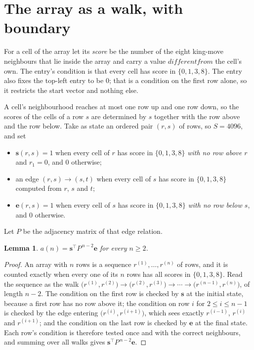\documentclass[11pt,a4paper]{article}
\theoremstyle{plain}
\newtheorem{lemma}[theorem]{Lemma}
\theoremstyle{definition}
\begin{document}
\section{The array as a walk, with boundary}

For a cell of the array let its \emph{score} be the number of the eight king-move neighbours that lie inside
the array and carry a value $different from$ the cell's own. The entry's condition is that every cell
has score in $\{0,1,3,8\}$. The entry also fixes the top-left entry to be $0$; that is a condition on the first row alone, so it restricts the start vector and nothing else.

A cell's neighbourhood reaches at most one row up and one row down, so the scores of the
cells of a row $s$ are determined by $s$ together with the row above and the row below.
Take as state an ordered pair $(r,s)$ of rows, so $S=4096$, and set
\begin{itemize}
\item $\mathbf{s}(r,s)=1$ when every cell of $r$ has score in $\{0,1,3,8\}$ \emph{with no row
above $r$} and $r_1=0$, and $0$ otherwise;
\item an edge $(r,s)\to(s,t)$ when every cell of $s$ has score in $\{0,1,3,8\}$ computed from
$r$, $s$ and $t$;
\item $\mathbf{e}(r,s)=1$ when every cell of $s$ has score in $\{0,1,3,8\}$ \emph{with no row
below $s$}, and $0$ otherwise.
\end{itemize}
Let $P$ be the adjacency matrix of that edge relation.

\begin{lemma}\label{lem:walk}
$a(n)=\mathbf{s}^{\!\top}P^{\,n-2}\mathbf{e}$ for every $n\ge2$.
\end{lemma}

\begin{proof}
An array with $n$ rows is a sequence $r^{(1)},\dots,r^{(n)}$ of rows, and it is counted
exactly when every one of its $n$ rows has all scores in $\{0,1,3,8\}$. Read the sequence as the
walk $\bigl(r^{(1)},r^{(2)}\bigr)\to\bigl(r^{(2)},r^{(3)}\bigr)\to\cdots\to
\bigl(r^{(n-1)},r^{(n)}\bigr)$, of length $n-2$. The condition on the first row is
checked by $\mathbf{s}$ at the initial state, because a first row has no row above it; the
condition on row $i$ for $2\le i\le n-1$ is checked by the edge entering
$\bigl(r^{(i)},r^{(i+1)}\bigr)$, which sees exactly $r^{(i-1)}$, $r^{(i)}$ and
$r^{(i+1)}$; and the condition on the last row is checked by $\mathbf{e}$ at the final
state. Each row's condition is therefore tested once and with the correct neighbours, and
summing over all walks gives $\mathbf{s}^{\!\top}P^{\,n-2}\mathbf{e}$.
\end{proof}
\end{document}

